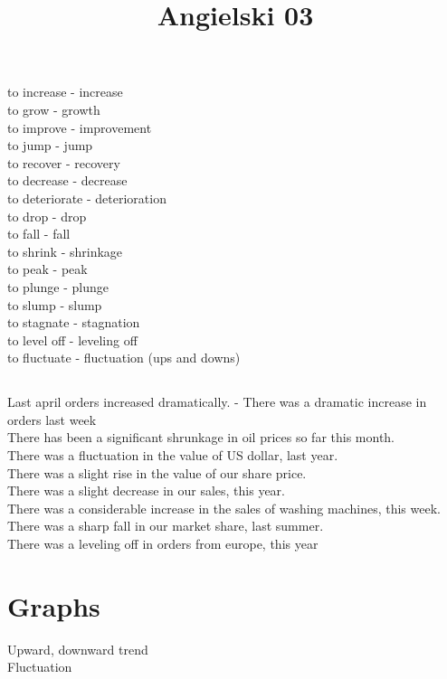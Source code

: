 \documentclass[a4paper,10pt]{article}
\title{Angielski 03}
\author{}
\begin{document}
\maketitle

\begin{abstract}

\end{abstract}

\subsection{}
to increase - increase \\
to grow - growth \\
to improve - improvement \\
to jump - jump \\
to recover - recovery \\
to decrease - decrease \\
to deteriorate - deterioration \\
to drop - drop \\
to fall - fall \\
to shrink - shrinkage \\
to peak - peak \\
to plunge - plunge \\
to slump - slump \\
to stagnate - stagnation \\
to level off - leveling off \\
to fluctuate - fluctuation (ups and downs)\\

\subsection{}
Last april orders increased dramatically. - There was a dramatic increase in orders last week \\
There has been a significant shrunkage in oil prices so far this month.\\
There was a fluctuation in the value of US dollar, last year. \\
There was a slight rise in the value of our share price. \\
There was a slight decrease in our sales, this year. \\
There was a considerable increase in the sales of washing machines, this week. \\
There was a sharp fall in our market share, last summer. \\
There was a leveling off in orders from europe, this year \\



\section{Graphs}
Upward, downward trend \\
Fluctuation\\
\end{document}

